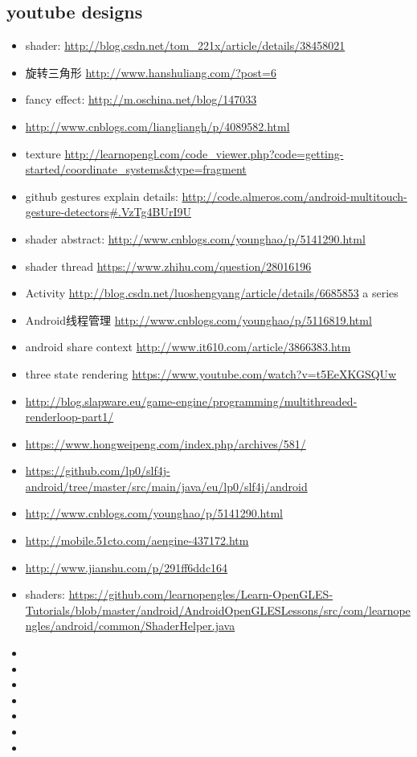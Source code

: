 \documentclass[9pt,b5paper]{article}
\begin{document}
\subsection{youtube designs}
\label{sec-2-1}
\begin{itemize}
\item shader: \url{http://blog.csdn.net/tom_221x/article/details/38458021}
\item 旋转三角形 \url{http://www.hanshuliang.com/?post=6}
\item fancy effect: \url{http://m.oschina.net/blog/147033}
\item \url{http://www.cnblogs.com/liangliangh/p/4089582.html}
\item texture \url{http://learnopengl.com/code_viewer.php?code=getting-started/coordinate_systems&type=fragment}
\item github gestures explain details: \url{http://code.almeros.com/android-multitouch-gesture-detectors#.VzTg4BUrI9U}
\item shader abstract: \url{http://www.cnblogs.com/younghao/p/5141290.html}
\item shader thread \url{https://www.zhihu.com/question/28016196}
\item Activity \url{http://blog.csdn.net/luoshengyang/article/details/6685853} a series
\item Android线程管理 \url{http://www.cnblogs.com/younghao/p/5116819.html}
\item android share context \url{http://www.it610.com/article/3866383.htm}
\item three state rendering \url{https://www.youtube.com/watch?v=t5EeXKGSQUw}
\item \url{http://blog.slapware.eu/game-engine/programming/multithreaded-renderloop-part1/}
\item \url{https://www.hongweipeng.com/index.php/archives/581/}
\item \url{https://github.com/lp0/slf4j-android/tree/master/src/main/java/eu/lp0/slf4j/android}
\item \url{http://www.cnblogs.com/younghao/p/5141290.html}
\item \url{http://mobile.51cto.com/aengine-437172.htm}
\item \url{http://www.jianshu.com/p/291ff6ddc164}
\item shaders: \url{https://github.com/learnopengles/Learn-OpenGLES-Tutorials/blob/master/android/AndroidOpenGLESLessons/src/com/learnopengles/android/common/ShaderHelper.java}
\item 
\item 
\item 
\item 
\item 
\item 
\item 
\end{itemize}
\end{document}
